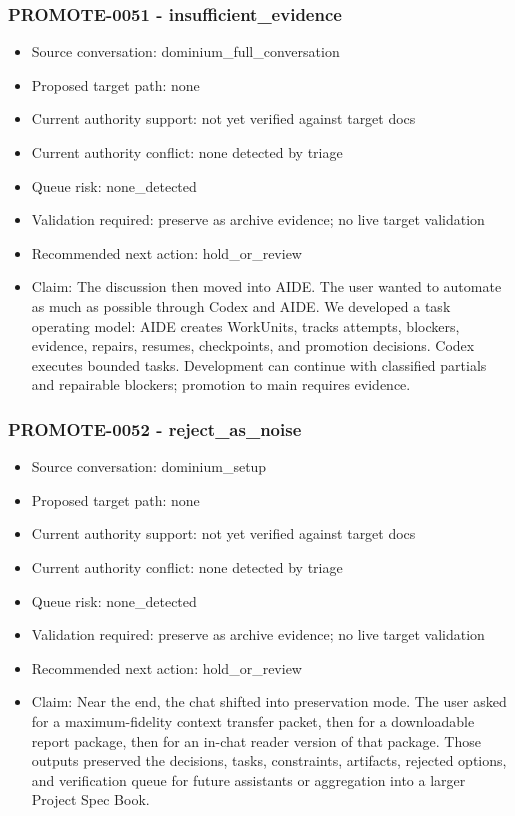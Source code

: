 \documentclass[11pt,a4paper]{report}
\begin{document}
\subsubsection{PROMOTE-0051 - insufficient\_evidence}

\begin{itemize}
\item Source conversation: dominium\_full\_conversation
\item Proposed target path: none
\item Current authority support: not yet verified against target docs
\item Current authority conflict: none detected by triage
\item Queue risk: none\_detected
\item Validation required: preserve as archive evidence; no live target validation
\item Recommended next action: hold\_or\_review
\item Claim: The discussion then moved into AIDE. The user wanted to automate as much as possible through Codex and AIDE. We developed a task operating model: AIDE creates WorkUnits, tracks attempts, blockers, evidence, repairs, resumes, checkpoints, and promotion decisions. Codex executes bounded tasks. Development can continue with classified partials and repairable blockers; promotion to main requires evidence.
\end{itemize}

\subsubsection{PROMOTE-0052 - reject\_as\_noise}

\begin{itemize}
\item Source conversation: dominium\_setup
\item Proposed target path: none
\item Current authority support: not yet verified against target docs
\item Current authority conflict: none detected by triage
\item Queue risk: none\_detected
\item Validation required: preserve as archive evidence; no live target validation
\item Recommended next action: hold\_or\_review
\item Claim: Near the end, the chat shifted into preservation mode. The user asked for a maximum-fidelity context transfer packet, then for a downloadable report package, then for an in-chat reader version of that package. Those outputs preserved the decisions, tasks, constraints, artifacts, rejected options, and verification queue for future assistants or aggregation into a larger Project Spec Book.
\end{itemize}
\end{document}
